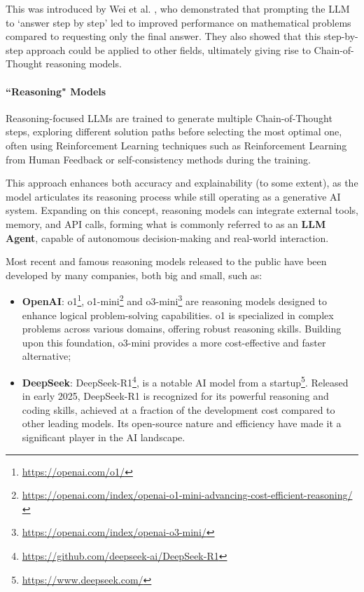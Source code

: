 This was introduced by Wei et al. \cite{wei2023chainofthoughtpromptingelicitsreasoning},
who demonstrated that prompting the LLM to `answer step by step' led to improved
performance on mathematical problems compared to requesting only the final
answer. They also showed that this step-by-step approach could be applied to other
fields, ultimately giving rise to Chain-of-Thought reasoning models.

\paragraph{``Reasoning" Models}
Reasoning-focused LLMs are trained to generate multiple Chain-of-Thought steps,
exploring different solution paths before selecting the most optimal one, often using
Reinforcement Learning \cite{deepseekai2025deepseekr1incentivizingreasoningcapability}
techniques such as Reinforcement Learning from Human Feedback or self-consistency
methods during the training.

This approach enhances both accuracy and explainability (to some extent), as the
model articulates its reasoning process while still operating as a generative AI
system. Expanding on this concept, reasoning models can integrate external tools,
memory, and API calls, forming what is commonly referred to as an \textbf{LLM
Agent}, capable of autonomous decision-making and real-world interaction.

Most recent and famous reasoning models released to the public have been developed
by many companies, both big and small, such as:
\begin{itemize}
  \item \textbf{OpenAI}: o1\footnote{\url{https://openai.com/o1/}}, o1-mini\footnote{\url{https://openai.com/index/openai-o1-mini-advancing-cost-efficient-reasoning/}}
    and o3-mini\footnote{\url{https://openai.com/index/openai-o3-mini/}} are reasoning
    models designed to enhance logical problem-solving capabilities. o1 is
    specialized in complex problems across various domains, offering robust reasoning
    skills. Building upon this foundation, o3-mini provides a more cost-effective
    and faster alternative;

  \item \textbf{DeepSeek}: DeepSeek-R1\footnote{\url{https://github.com/deepseek-ai/DeepSeek-R1}},
    is a notable AI model from a startup\footnote{\url{https://www.deepseek.com/}}.
    Released in early 2025, DeepSeek-R1 is recognized for its powerful reasoning
    and coding skills, achieved at a fraction of the development cost compared to
    other leading models. Its open-source nature and efficiency have made it a
    significant player in the AI landscape.
\end{itemize}

